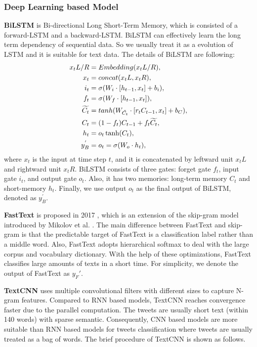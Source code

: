 \subsubsection{Deep Learning based Model}
\textbf{BiLSTM} is Bi-directional Long Short-Term Memory, which is consisted of a forward-LSTM and a backward-LSTM. BiLSTM can effectively learn the long term dependency of sequential data. So we usually treat it as a evolution of LSTM and it is suitable for text data. The details of BiLSTM are following:
\begin{align}\label{eq:lstm}
x_tL/R &= Embedding(x_tL/R), \\
x_t &= concat(x_tL, x_tR), \\
i_t &= \sigma(W_i \cdot [h_{t-1}, x_t] + b_i),\\
f_t &= \sigma(W_f \cdot [h_{t-1}, x_t]),\\
\widetilde{C_t} &= tanh(W_{\tilde{C_t}} \cdot [r_t C_{t-1}, x_t]  + b_C),\\
C_t &= (1-f_t) C_{t-1} + f_t \widetilde{C_t},\\
h_t &=o_t \* \tanh(C_t),\\
y_B^{'} &= o_t =  \sigma(W_o \cdot h_t),
\end{align}
where $x_t$ is the input at time step $t$, and it is concatenated by leftward unit $x_tL$ and rightward unit $x_tR$. BiLSTM consists of three gates: forget gate $f_t$, input gate $i_t$, and output gate $o_t$. Also, it has two memories: long-term memory $C_t$ and short-memory $h_t$. Finally, we use output $o_t$ as the final output of BiLSTM, denoted as $y_B^{'}$.

\textbf{FastText} is proposed in 2017 \cite{DBLP:journals/tacl/BojanowskiGJM17, DBLP:journals/corr/JoulinGBDJM16, DBLP:conf/eacl/GraveMJB17}, which is an extension of the skip-gram model introduced by Mikolov et al. \cite{DBLP:conf/nips/MikolovSCCD13}. The main difference between FastText and skip-gram is that the predictable target of FastText is a classification label rather than a middle word. Also, FastText adopts hierarchical softmax to deal with the large corpus and vocabulary dictionary. With the help of these optimizations, FastText classifies large amounts of texts in a short time. For simplicity, we denote the output of FastText as $y_F'$.

\textbf{TextCNN} \cite{DBLP:conf/emnlp/Kim14} uses multiple convolutional filters with different sizes to capture N-gram features. Compared to RNN based models, TextCNN reaches convergence faster due to the parallel computation. The tweets are usually short text (within 140 words) with sparse semantic. Consequently, CNN based models are more suitable than RNN based models for tweets classification where tweets are usually treated as a bag of words. The brief procedure of TextCNN is shown as follows.

